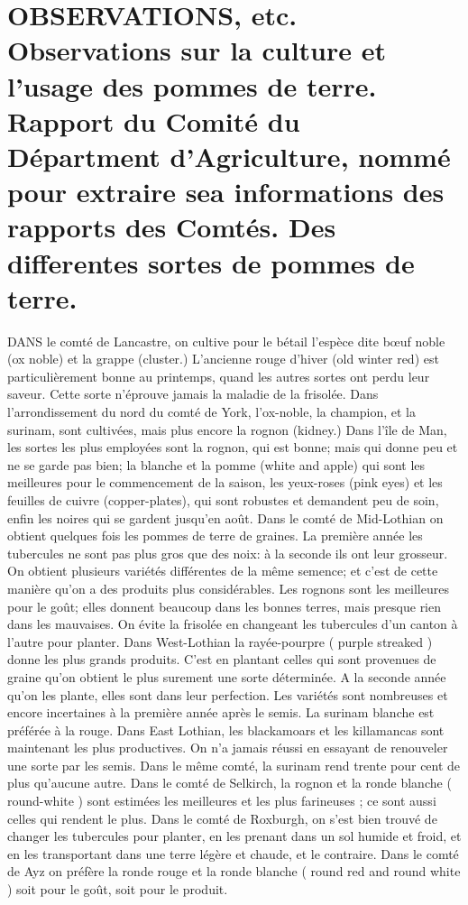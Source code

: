 \setcounter{page}{259}
\section{OBSERVATIONS, etc. Observations sur la culture et l'usage des pommes de terre. Rapport du Comité du Départment d'Agriculture, nommé pour extraire sea informations des rapports des Comtés. \large{Des differentes sortes de pommes de terre.}}
DANS le comté de Lancastre, on cultive pour le bétail l'espèce dite bœuf noble (ox noble) et la grappe (cluster.) L'ancienne
\setcounter{page}{260} rouge d'hiver (old winter red) est particulièrement bonne au printemps, quand les autres sortes ont perdu leur saveur. Cette sorte n'éprouve jamais la maladie de la frisolée.
Dans l'arrondissement du nord du comté de York, l'ox-noble, la champion, et la surinam, sont cultivées, mais plus encore la rognon (kidney.)
Dans l'île de Man, les sortes les plus employées sont la rognon, qui est bonne; mais qui donne peu et ne se garde pas bien; la blanche et la pomme (white and apple) qui sont les meilleures pour le commencement de la saison, les yeux-roses (pink eyes) et les feuilles de cuivre (copper-plates), qui sont robustes et demandent peu de soin, enfin les noires qui se gardent jusqu'en août.
Dans le comté de Mid-Lothian on obtient quelques fois les pommes de terre de graines. La première année les tubercules ne sont pas plus gros que des noix: à la seconde ils ont leur grosseur. On obtient plusieurs variétés différentes de la même semence; et c'est de cette manière qu'on a des produits plus considérables. Les rognons sont les meilleures pour le goût; elles donnent beaucoup dans les bonnes\setcounter{page}{261} terres, mais presque rien dans les mauvaises. On évite la frisolée en changeant les tubercules d'un canton à l'autre pour planter. Dans West-Lothian la rayée-pourpre ( purple streaked ) donne les plus grands produits. C'est en plantant celles qui sont provenues de graine qu'on obtient le plus surement une sorte déterminée. A la seconde année qu'on les plante, elles sont dans leur perfection. Les variétés sont nombreuses et encore incertaines à la première année après le semis. La surinam blanche est préférée à la rouge. Dans East Lothian, les blackamoars et les killamancas sont maintenant les plus productives. On n'a jamais réussi en essayant de renouveler une sorte par les semis. Dans le même comté, la surinam rend trente pour cent de plus qu'aucune autre. Dans le comté de Selkirch, la rognon et la ronde blanche ( round-white ) sont estimées les meilleures et les plus farineuses ; ce sont aussi celles qui rendent le plus. Dans le comté de Roxburgh, on s'est bien trouvé de changer les tubercules pour planter, en les prenant dans un sol humide et froid, et en les transportant dans une terre légère et chaude, et le contraire. Dans le comté de Ayz on préfère la ronde rouge et la ronde blanche ( round red and\setcounter{page}{262} round white ) soit pour le goût, soit pour le produit.
